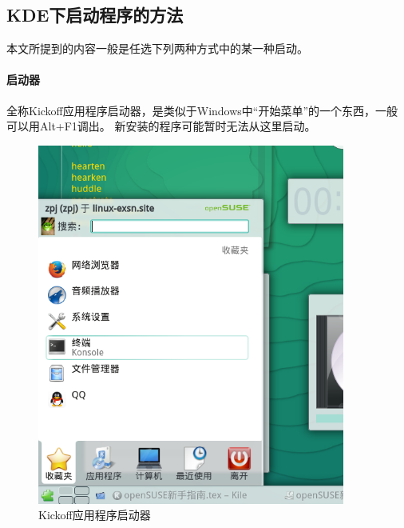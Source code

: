 \documentclass[11pt,openany]{book}
\begin{document}
\subsection{KDE下启动程序的方法}
本文所提到的内容一般是任选下列两种方式中的某一种启动。
\paragraph{启动器} 全称Kickoff应用程序启动器，是类似于Windows中“开始菜单”的一个东西，一般可以用Alt+F1调出。
新安装的程序可能暂时无法从这里启动。
\begin{figure}[htbp!]
\centering
\includegraphics[width=0.9\textwidth]{./pic/kickoff.png} 
\caption{Kickoff应用程序启动器}
\end{figure}
\end{document}
